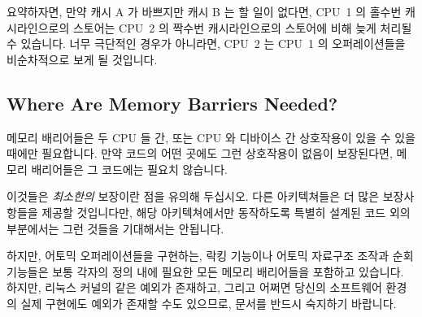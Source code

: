 \begin{enumerate}
요약하자면, 만약 캐시 A 가 바쁘지만 캐시 B 는 할 일이 없다면, CPU~1 의 홀수번
캐시라인으로의 스토어는 CPU~2 의 짝수번 캐시라인으로의 스토어에 비해 늦게
처리될 수 있습니다.
너무 극단적인 경우가 아니라면, CPU~2 는 CPU~1 의 오퍼레이션들을 비순차적으로
보게 될 것입니다.

	  {}

\subsection{Where Are Memory Barriers Needed?}
\label{sec:advsync:Where Are Memory Barriers Needed?}

메모리 배리어들은 두 CPU 들 간, 또는 CPU 와 디바이스 간 상호작용이 있을 수 있을
때에만 필요합니다.
만약 코드의 어떤 곳에도 그런 상호작용이 없음이 보장된다면, 메모리 배리어들은 그
코드에는 필요치 않습니다.

이것들은 \emph{최소한의} 보장이란 점을 유의해 두십시오.
다른 아키텍쳐들은
더 많은 보장사항들을 제공할 것입니다만, 해당 아키텍쳐에서만 동작하도록 특별히
설계된 코드 외의 부분에서는 그런 것들을 기대해서는 안됩니다.

하지만, 어토믹 오퍼레이션들을 구현하는, 락킹 기능이나 어토믹 자료구조 조작과
순회 기능들은 보통 각자의 정의 내에 필요한 모든 메모리 배리어들을 포함하고
있습니다.
하지만, 리눅스 커널의  같은 예외가 존재하고, 그리고 어쩌면
당신의 소프트웨어 환경의 실제 구현에도 예외가 존재할 수도 있으므로, 문서를
반드시 숙지하기 바랍니다.


\end{enumerate}
